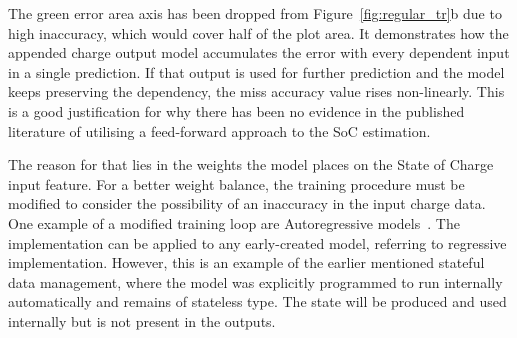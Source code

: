 %
%
%
The green error area axis has been dropped from \mbox{Figure~\ref{fig:regular_tr}b} due to high inaccuracy, which would cover half of the plot area.
It demonstrates how the appended charge output model accumulates the error with every dependent input in a single prediction.
If that output is used for further prediction and the model keeps preserving the dependency, the miss accuracy value rises non-linearly.
This is a good justification for why there has been no evidence in the published literature of utilising a feed-forward approach to the SoC estimation.

%
%
The reason for that lies in the weights the model places on the State of Charge input feature.
For a better weight balance, the training procedure must be modified to consider the possibility of an inaccuracy in the input charge data.
One example of a modified training loop are Autoregressive models~\cite{time_2020}.
The implementation can be applied to any early-created model, referring to regressive implementation.
However, this is an example of the earlier mentioned stateful data management, where the model was explicitly programmed to run internally automatically and remains of stateless type.
The state will be produced and used internally but is not present in the outputs.
